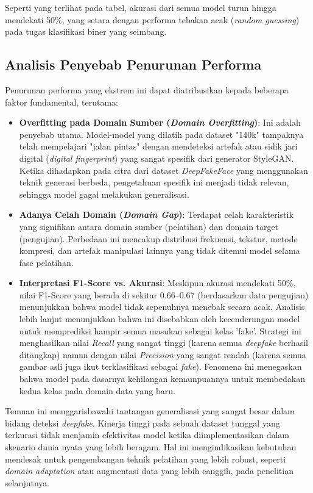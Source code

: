 Seperti yang terlihat pada tabel, akurasi dari semua model turun hingga mendekati 50\%, yang setara dengan performa tebakan acak (\textit{random guessing}) pada tugas klasifikasi biner yang seimbang.

\subsection{Analisis Penyebab Penurunan Performa}
Penurunan performa yang ekstrem ini dapat diatribusikan kepada beberapa faktor fundamental, terutama:

\begin{itemize}
    \item \textbf{Overfitting pada Domain Sumber (\textit{Domain Overfitting})}: Ini adalah penyebab utama. Model-model yang dilatih pada dataset "140k" tampaknya telah mempelajari "jalan pintas" dengan mendeteksi artefak atau sidik jari digital (\textit{digital fingerprint}) yang sangat spesifik dari generator StyleGAN. Ketika dihadapkan pada citra dari dataset \textit{DeepFakeFace} yang menggunakan teknik generasi berbeda, pengetahuan spesifik ini menjadi tidak relevan, sehingga model gagal melakukan generalisasi.

    \item \textbf{Adanya Celah Domain (\textit{Domain Gap})}: Terdapat celah karakteristik yang signifikan antara domain sumber (pelatihan) dan domain target (pengujian). Perbedaan ini mencakup distribusi frekuensi, tekstur, metode kompresi, dan artefak manipulasi lainnya yang tidak ditemui model selama fase pelatihan.

    \item \textbf{Interpretasi F1-Score vs. Akurasi}: Meskipun akurasi mendekati 50\%, nilai F1-Score yang berada di sekitar 0.66--0.67 (berdasarkan data pengujian) menunjukkan bahwa model tidak sepenuhnya menebak secara acak. Analisis lebih lanjut menunjukkan bahwa ini disebabkan oleh kecenderungan model untuk memprediksi hampir semua masukan sebagai kelas 'fake'. Strategi ini menghasilkan nilai \textit{Recall} yang sangat tinggi (karena semua \textit{deepfake} berhasil ditangkap) namun dengan nilai \textit{Precision} yang sangat rendah (karena semua gambar asli juga ikut terklasifikasi sebagai \textit{fake}). Fenomena ini menegaskan bahwa model pada dasarnya kehilangan kemampuannya untuk membedakan kedua kelas pada domain data yang baru.
\end{itemize}

Temuan ini menggarisbawahi tantangan generalisasi yang sangat besar dalam bidang deteksi \textit{deepfake}. Kinerja tinggi pada sebuah dataset tunggal yang terkurasi tidak menjamin efektivitas model ketika diimplementasikan dalam skenario dunia nyata yang lebih beragam. Hal ini mengindikasikan kebutuhan mendesak untuk pengembangan teknik pelatihan yang lebih robust, seperti \textit{domain adaptation} atau augmentasi data yang lebih canggih, pada penelitian selanjutnya.

